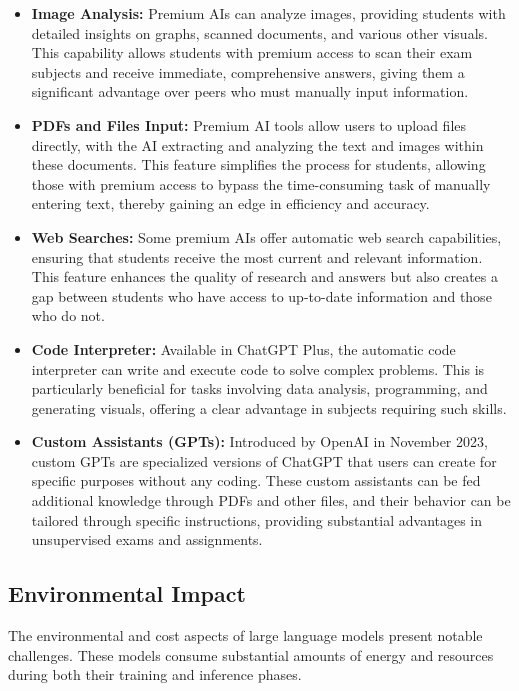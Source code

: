\documentclass{article}
\begin{document}
\begin{itemize}
    \item \textbf{Image Analysis:} Premium AIs can analyze images, providing students with detailed insights on graphs, scanned documents, and various other visuals. This capability allows students with premium access to scan their exam subjects and receive immediate, comprehensive answers, giving them a significant advantage over peers who must manually input information.
    \item \textbf{PDFs and Files Input:} Premium AI tools allow users to upload files directly, with the AI extracting and analyzing the text and images within these documents. This feature simplifies the process for students, allowing those with premium access to bypass the time-consuming task of manually entering text, thereby gaining an edge in efficiency and accuracy.
    \item \textbf{Web Searches:} Some premium AIs offer automatic web search capabilities, ensuring that students receive the most current and relevant information. This feature enhances the quality of research and answers but also creates a gap between students who have access to up-to-date information and those who do not.
    \item \textbf{Code Interpreter:} Available in ChatGPT Plus, the automatic code interpreter can write and execute code to solve complex problems. This is particularly beneficial for tasks involving data analysis, programming, and generating visuals, offering a clear advantage in subjects requiring such skills.
    \item \textbf{Custom Assistants (GPTs):} Introduced by OpenAI in November 2023, custom GPTs are specialized versions of ChatGPT that users can create for specific purposes without any coding. These custom assistants can be fed additional knowledge through PDFs and other files, and their behavior can be tailored through specific instructions, providing substantial advantages in unsupervised exams and assignments.
\end{itemize}

\subsection{Environmental Impact}

The environmental and cost aspects of large language models present notable challenges. These models consume substantial amounts of energy and resources during both their training and inference phases.
\end{document}
